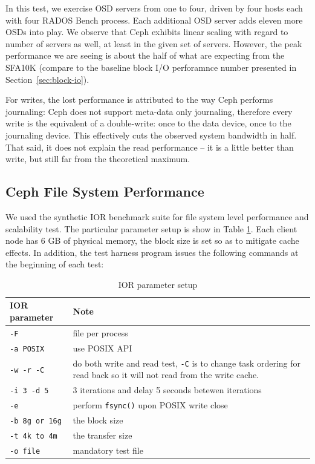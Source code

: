 In this test, we exercise OSD servers from one to four, driven by four hosts
each with four RADOS Bench process. Each additional OSD server
adds eleven more OSDs into play. We observe that Ceph exhibits linear scaling with
regard to number of servers as well, at least in the given set of servers.
However, the peak performance we are seeing is about the half of what are
expecting from the SFA10K (compare to the baseline block I/O perforamnce number
presented in Section~\ref{sec:block-io}).

For writes, the lost performance is attributed to the way Ceph performs
journaling:
Ceph does not support meta-data only journaling, therefore every write is the
equivalent of a double-write: once to the data device, once to the journaling
device. This effectively cuts the observed system bandwidth in half. That said,
it does not explain the read performance -- it is a little better than write,
but still far from the theoretical maximum.

\subsection{Ceph File System Performance}

We used the synthetic IOR benchmark suite for file system level performance
and scalability test.  The particular parameter setup is show in Table
\ref{tbl:ior}. Each client node has 6 GB of physical memory, the block size is
set so as to mitigate cache effects. In addition, the test harness program
issues the following commands at the beginning of each test:


\begin{table}[tb]
\caption{IOR parameter setup}
\label{tbl:ior}
\centering
\begin{tabular}{p{0.8in} | p{2in}}
    \hline
    IOR parameter & Note \\ \hline
    \verb!-F! & file per process \\ \hline
    \verb!-a POSIX! & use POSIX API \\ \hline
    \verb!-w -r -C! & do both write and read test, \verb!-C! is to change task
        ordering for read back so it will not read from the write cache. \\
        \hline
    \verb!-i 3 -d 5! & 3 iterations and delay 5 seconds betewen iterations \\ \hline  
    \verb!-e! & perform \verb!fsync()! upon POSIX write close \\ \hline
    \verb!-b 8g or 16g! & the block size \\ \hline
    \verb!-t 4k to 4m! & the transfer size \\ \hline
    \verb!-o file! & mandatory test file  \\    
    \hline
\end{tabular}
\end{table}


